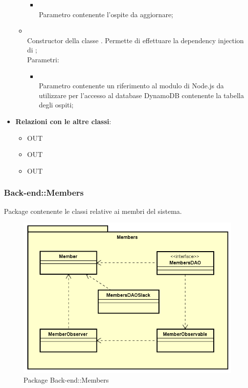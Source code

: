 \begin{itemize}
\begin{itemize}
\begin{itemize}
			\item {} \\
			Parametro contenente l'ospite da aggiornare;
		\end{itemize}
		\item[]  \\		Constructor della classe . Permette di effettuare la dependency injection di ;\\
		Parametri:
		\begin{itemize}
			\item {} \\
			Parametro contenente un riferimento al modulo di Node.js da utilizzare per l'accesso al database DynamoDB contenente la tabella degli ospiti;
		\end{itemize}
	\end{itemize}
	\item \textbf{Relazioni con le altre classi}:
	\begin{itemize}
		\item OUT \hyperlink{Guest_label}{}
		\item OUT \hyperlink{GuestObservable_label}{}
		\item OUT \hyperlink{ErrorObservable_label}{}
	\end{itemize}
\end{itemize}
\FloatBarrier

\subsubsection{Back-end::Members}
Package contenente le classi relative ai membri del sistema.
\begin{figure}[h] \centering \includegraphics[width=\textwidth,height=\textheight,keepaspectratio]{images/diagrams/back-end/Official_Backend_0304/Member.png}
	\caption{Package Back-end::Members}
\end{figure}
\newpage
